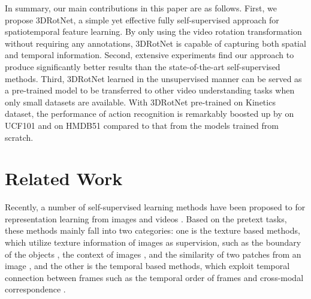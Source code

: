 \documentclass[10pt,twocolumn,letterpaper]{article}
\begin{document}
In summary, our main contributions in this paper are as follows. First, we propose 3DRotNet, a simple yet effective fully self-supervised approach for spatiotemporal feature learning. By only using the video rotation transformation without requiring any annotations, 3DRotNet is capable of capturing both spatial and temporal information. Second, extensive experiments find our approach to produce significantly better results than the state-of-the-art self-supervised methods. Third, 3DRotNet learned in the unsupervised manner can be served as a pre-trained model to be transferred to other video understanding tasks when only small datasets are available. With 3DRotNet pre-trained on Kinetics dataset, the performance of action recognition is remarkably boosted up by  on UCF101 and  on HMDB51 compared to that from the models trained from scratch.       

\section{Related Work}

Recently, a number of self-supervised learning methods have been proposed to for representation learning from images and videos \cite{contextprediction, doersch2017multi, shuffleandlearn, mundhenk2018improvements, inpainting, SynGAN, SelfSurvey}. Based on the pretext tasks, these methods mainly fall into two categories: one is the texture based methods, which utilize texture information of images as supervision, such as the boundary of the objects \cite{unsupervisededges, SynGAN}, the context of images \cite{larsson2017colorproxy, inpainting}, and the similarity of two patches from an image \cite{contextprediction, contrasting, jigsaw, boosting, wang2017transitive}, and the other is the temporal based methods, which exploit temporal connection between frames such as the temporal order of frames \cite{O3N, OPN, shuffleandlearn} and cross-modal correspondence \cite{VTS, crossandlearn}.
\end{document}
